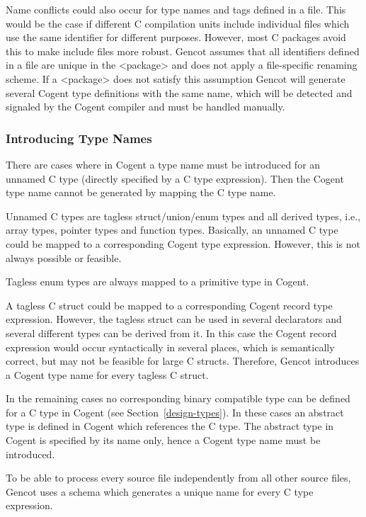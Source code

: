 Name conflicts could also occur for type names and tags defined in a  file. This would be the case if different
C compilation units include individual  files which use the same identifier for different purposes. However, most
C packages avoid this to make include files more robust. Gencot assumes that all identifiers defined in a  file
are unique in the <package> and does not apply a file-specific renaming scheme. If a <package> does not satisfy this assumption
Gencot will generate several Cogent type definitions with the same name, which will be detected and signaled by the Cogent 
compiler and must be handled manually.

\subsubsection{Introducing Type Names}

There are cases where in Cogent a type name must be introduced for an unnamed C type (directly specified by a C type 
expression). Then the Cogent type name cannot be generated by mapping the C type name.

Unnamed C types are tagless struct/union/enum types and all derived types, i.e., array types, pointer types and 
function types. Basically, an unnamed C type could be mapped to a corresponding Cogent type expression. However,
this is not always possible or feasible.

Tagless enum types
are always mapped to a primitive type in Cogent.

A tagless C struct could be mapped to a corresponding Cogent record type expression. However, the tagless struct
can be used in several declarators and several different types can be derived from it. In this case the Cogent record
expression would occur syntactically in several places, which is semantically correct, but may not be feasible for
large C structs. Therefore, Gencot introduces a Cogent type name for every tagless C struct.

In the remaining cases no corresponding binary compatible type can be defined for a C type in Cogent 
(see Section~\ref{design-types}). In these cases 
an abstract type is defined in Cogent which references the C type. The abstract type in Cogent is specified by its 
name only, hence a Cogent type name must be introduced.

To be able to process every source file independently from all other source files, Gencot uses a schema which generates
a unique name for every C type expression. 


